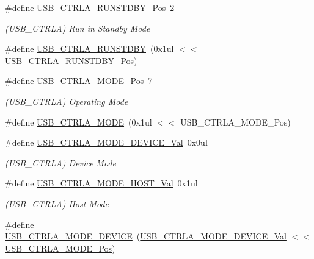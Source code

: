 \begin{DoxyCompactItemize}
\item 
\#define \mbox{\hyperlink{group___s_a_m_d21___u_s_b_ga2b12657c13e6fd8ac186e7fb163f1f53}{U\+S\+B\+\_\+\+C\+T\+R\+L\+A\+\_\+\+R\+U\+N\+S\+T\+D\+B\+Y\+\_\+\+Pos}}~2
\begin{DoxyCompactList}\small\item\em (U\+S\+B\+\_\+\+C\+T\+R\+LA) Run in Standby Mode \end{DoxyCompactList}\item 
\#define \mbox{\hyperlink{group___s_a_m_d21___u_s_b_ga8d6f688d7c5bdaae85b2db832ae8444b}{U\+S\+B\+\_\+\+C\+T\+R\+L\+A\+\_\+\+R\+U\+N\+S\+T\+D\+BY}}~(0x1ul $<$$<$ U\+S\+B\+\_\+\+C\+T\+R\+L\+A\+\_\+\+R\+U\+N\+S\+T\+D\+B\+Y\+\_\+\+Pos)
\item 
\#define \mbox{\hyperlink{group___s_a_m_d21___u_s_b_ga6261dc0af6c78b43e18d13ffeeccac0f}{U\+S\+B\+\_\+\+C\+T\+R\+L\+A\+\_\+\+M\+O\+D\+E\+\_\+\+Pos}}~7
\begin{DoxyCompactList}\small\item\em (U\+S\+B\+\_\+\+C\+T\+R\+LA) Operating Mode \end{DoxyCompactList}\item 
\#define \mbox{\hyperlink{group___s_a_m_d21___u_s_b_gafc72901c167d89fab62aba3679497247}{U\+S\+B\+\_\+\+C\+T\+R\+L\+A\+\_\+\+M\+O\+DE}}~(0x1ul $<$$<$ U\+S\+B\+\_\+\+C\+T\+R\+L\+A\+\_\+\+M\+O\+D\+E\+\_\+\+Pos)
\item 
\#define \mbox{\hyperlink{group___s_a_m_d21___u_s_b_ga4105f7a7046ef185465586b7e4a44909}{U\+S\+B\+\_\+\+C\+T\+R\+L\+A\+\_\+\+M\+O\+D\+E\+\_\+\+D\+E\+V\+I\+C\+E\+\_\+\+Val}}~0x0ul
\begin{DoxyCompactList}\small\item\em (U\+S\+B\+\_\+\+C\+T\+R\+LA) Device Mode \end{DoxyCompactList}\item 
\#define \mbox{\hyperlink{group___s_a_m_d21___u_s_b_gaedee7c0852094d9fcbd25760a4330ef3}{U\+S\+B\+\_\+\+C\+T\+R\+L\+A\+\_\+\+M\+O\+D\+E\+\_\+\+H\+O\+S\+T\+\_\+\+Val}}~0x1ul
\begin{DoxyCompactList}\small\item\em (U\+S\+B\+\_\+\+C\+T\+R\+LA) Host Mode \end{DoxyCompactList}\item 
\#define \mbox{\hyperlink{group___s_a_m_d21___u_s_b_gab7f4f04215759164d9addaf69f4a0a46}{U\+S\+B\+\_\+\+C\+T\+R\+L\+A\+\_\+\+M\+O\+D\+E\+\_\+\+D\+E\+V\+I\+CE}}~(\mbox{\hyperlink{group___s_a_m_d21___u_s_b_ga4105f7a7046ef185465586b7e4a44909}{U\+S\+B\+\_\+\+C\+T\+R\+L\+A\+\_\+\+M\+O\+D\+E\+\_\+\+D\+E\+V\+I\+C\+E\+\_\+\+Val}}     $<$$<$ \mbox{\hyperlink{group___s_a_m_d21___u_s_b_ga6261dc0af6c78b43e18d13ffeeccac0f}{U\+S\+B\+\_\+\+C\+T\+R\+L\+A\+\_\+\+M\+O\+D\+E\+\_\+\+Pos}})
$$
\end{DoxyCompactItemize}
